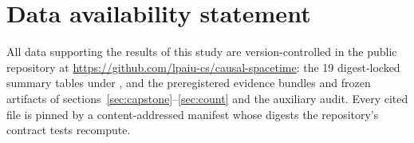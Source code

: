 \section*{Data availability statement}

All data supporting the results of this study are version-controlled in
the public repository at
\url{https://github.com/lpaiu-cs/causal-spacetime}: the 19 digest-locked
summary tables under , and the preregistered
evidence bundles and frozen artifacts of
sections~\ref{sec:capstone}--\ref{sec:count} and the auxiliary audit.
Every cited file is pinned by a content-addressed manifest whose digests
the repository's contract tests recompute.
